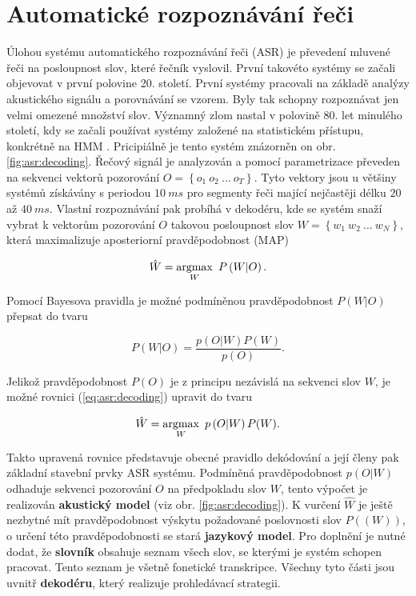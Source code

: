 \chapter{Automatické rozpoznávání řeči}
\label{chap:asr}

Úlohou systému automatického rozpoznávání řeči (ASR) je převedení mluvené řeči na posloupnost slov, které řečník vyslovil. První takovéto systémy se začali objevovat v první polovine 20. století. První systémy pracovali na základě analýzy akustického signálu a porovnávání se vzorem. Byly tak schopny rozpoznávat jen velmi omezené množství slov. Významný zlom nastal v polovině 80. let minulého století, kdy se začali používat systémy založené na statistickém přístupu, konkrétně na HMM \cite{Holmes2001}. Pricipiálně je tento systém znázorněn on obr. \ref{fig:asr:decoding}. Řečový signál je analyzován a pomocí parametrizace převeden na sekvenci vektorů pozorování $O = \left\{o_1\ o_2\ \dots\ o_T\right\}$. Tyto vektory jsou u většiny systémů získávány s periodou $10\ ms$ pro segmenty řeči mající nejčastěji délku $20$ až $40\ ms$. Vlastní rozpoznávání pak probíhá v dekodéru, kde se systém snaží vybrat k vektorům pozorování $O$ takovou posloupnost slov $W = \left\{w_1\ w_2\ \dots\ w_N\right\}$, která maximalizuje aposteriorní pravděpodobnost (MAP)

\begin{equation}
  \hat{W} = \operatorname*{argmax}_W\ P\left(W | O\right).
  \label{eq:asr:decoding}
\end{equation}

Pomocí Bayesova pravidla je možné podmíněnou pravděpodobnost $P\left(W | O\right)$ přepsat do tvaru

\begin{equation}
  P\left(W | O\right) = \frac{p(O|W)P(W)}{p(O)}.
\end{equation}

Jelikož pravděpodobnost $P(O)$ je z principu nezávislá na sekvenci slov $W$, je možné rovnici (\ref{eq:asr:decoding}) upravit do tvaru

\begin{equation}
  \hat{W} = \operatorname*{argmax}_W\ p\left(O | W\right)P(W).
  \label{eq:asr:decoding:generic}
\end{equation}

Takto upravená rovnice představuje obecné pravidlo dekódování a její členy pak základní stavební prvky ASR systému. Podmíněná pravděpodobnost $p(O | W)$ odhaduje sekvenci pozorování $O$ na předpokladu slov $W$, tento výpočet je realizován \textbf{akustický model} (viz obr. \ref{fig:asr:decoding}). K vurčení $\hat{W}$ je ještě nezbytné mít pravděpodobnost výskytu požadované poslovnosti slov $P((W))$, o určení této pravděpodobnosti se stará \textbf{jazykový model}. Pro doplnění je nutné dodat, že \textbf{slovník} obsahuje seznam všech slov, se kterými je systém schopen pracovat. Tento seznam je všetně fonetické transkripce. Všechny tyto části jsou uvnitř \textbf{dekodéru}, který realizuje prohledávací strategii.

